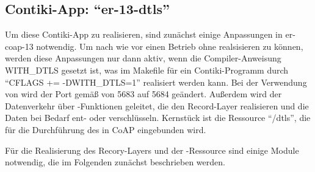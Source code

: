 \subsection{Contiki-App: "`er-13-dtls"'}

Um diese Contiki-App zu realisieren, sind zunächst einige Anpassungen in er-coap-13 notwendig. Um nach wie vor einen Betrieb ohne  realsisieren zu können,
werden diese Anpassungen nur dann aktiv, wenn die Compiler-Anweisung WITH\_DTLS gesetzt ist, was im Makefile für ein Contiki-Programm durch "`CFLAGS += -DWITH\_DTLS=1"'
realisiert werden kann. Bei der Verwendung von  wird der Port gemäß \cite[Seite 93]{portnumbers} von 5683 auf 5684 geändert. Außerdem wird der Datenverkehr
über -Funktionen geleitet, die den Record-Layer realisieren und die Daten bei Bedarf ent- oder verschlüsseln. Kernstück ist die Ressource "`/dtls"', die für
die Durchführung des  in CoAP eingebunden wird.

Für die Realisierung des Recory-Layers und der -Ressource sind einige Module notwendig, die im Folgenden zunächst beschrieben werden.

